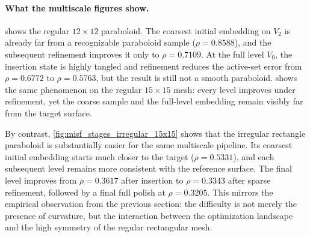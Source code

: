 \documentclass[twoside,11pt]{article}
\begin{document}
\paragraph{What the multiscale figures show.}
 shows the regular $12\times 12$
paraboloid.  The coarsest initial embedding on $V_2$ is already far from a
recognizable paraboloid sample ($\rho = 0.8588$), and the subsequent
refinement improves it only to $\rho = 0.7109$.  At the full level $V_0$, the
insertion state is highly tangled and refinement reduces the active-set error
from $\rho = 0.6772$ to $\rho = 0.5763$, but the result is still not a smooth
paraboloid.   shows the same phenomenon on
the regular $15\times 15$ mesh: every level improves under refinement, yet the
coarse sample and the full-level embedding remain visibly far from the target
surface.

By contrast, \cref{fig:misf_stages_irregular_15x15} shows that the irregular
rectangle paraboloid is substantially easier for the same multiscale pipeline.
Its coarsest initial embedding starts much closer to the target
($\rho = 0.5331$), and each subsequent level remains more consistent with the
reference surface.  The final level improves from $\rho = 0.3617$ after
insertion to $\rho = 0.3343$ after sparse refinement, followed by a final full
polish at $\rho = 0.3205$.  This mirrors the empirical observation from the
previous section: the difficulty is not merely the presence of curvature, but
the interaction between the optimization landscape and the high symmetry of the
regular rectangular mesh.
\end{document}
